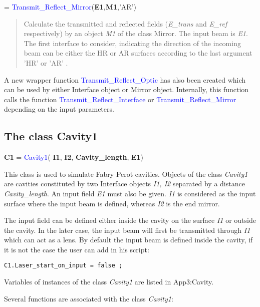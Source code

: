 = \textcolor{blue}{Transmit\_Reflect\_Mirror}(\textbf{E1},\textbf{M1},'AR')
\vspace*{-0.2cm}
\begin{quote}
Calculate the transmitted and reflected fields (\textsl{E\_trans} and \textsl{E\_ref} respectively) by an object \textsl{M1} of the class Mirror. The input beam is \textsl{E1}. The first interface to consider, indicating the direction of the incoming beam can be either the HR or AR surfaces according to the last argument 'HR' or 'AR' .
\end{quote}

A new wrapper function \textcolor{blue}{Transmit\_Reflect\_Optic} has also been created which can be used by either Interface object or Mirror object. Internally, this function calls the function \textcolor{blue}{Transmit\_Reflect\_Interface} or \textcolor{blue}{Transmit\_Reflect\_Mirror} depending on the input parameters.

\subsection{The class Cavity1}
\textbf{C1} = \textcolor{blue}{Cavity1}( \textbf{I1}, \textbf{I2}, \textbf{Cavity\_length}, \textbf{E1})

This class is used to simulate Fabry Perot cavities. Objects of the class \textsl{Cavity1} are cavities constituted by two Interface objects \textsl{I1, I2} separated by a distance \textsl{Cavity\_length}. An input field \textsl{E1} must also be given. \textsl{I1} is considered as the input surface where the input beam is defined, whereas \textsl{I2} is the end mirror.

The input field can be defined either inside the cavity on the surface \textsl{I1} or outside the cavity. In the later case, the input beam will first be transmitted through \textsl{I1} which can act as a lens. By default the input beam is defined inside the cavity, if it is not the case the user can add in his script:
\begin{verbatim}
C1.Laser_start_on_input = false ;
\end{verbatim}

Variables of instances of the class \textsl{Cavity1} are listed in {App3:Cavity}.

\noindent Several functions are associated with the class \textsl{Cavity1}:

